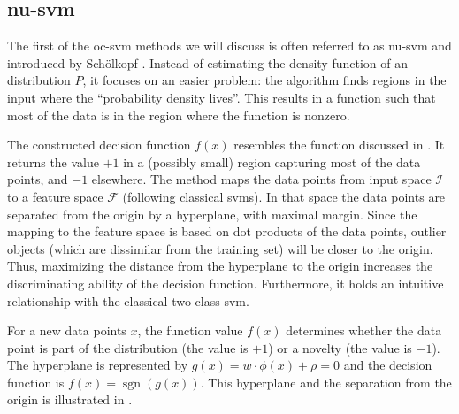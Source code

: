 



\subsection{\acrlong{nu-svm}}\label{subsec:nu-svm}
The first of the \gls{oc-svm} methods we will discuss is often referred to as \gls{nu-svm} and introduced by Sch\"olkopf \etal \cite{scholkopf1999support}.
Instead of estimating the density function of an distribution $P$, it focuses on an easier problem: the algorithm finds regions in the input where the ``probability density lives''.
This results in a function such that most of the data is in the region where the function is nonzero.

The constructed decision function $f(x)$ resembles the function discussed in .
It returns the value $+1$ in a (possibly small) region capturing most of the data points, and $-1$ elsewhere.
The method maps the data points from input space $\mathcal{I}$ to a feature space $\mathcal{F}$ (following classical \glspl{svm}).
In that space the data points are separated from the origin by a hyperplane, with maximal margin.
Since the mapping to the feature space is based on dot products of the data points, outlier objects (which are dissimilar from the training set) will be closer to the origin.
Thus, maximizing the distance from the hyperplane to the origin increases the discriminating ability of the decision function.
Furthermore, it holds an intuitive relationship with the classical two-class \gls{svm}.

For a new data points $x$, the function value $f(x)$ determines whether the data point is part of the distribution (\ie the value is $+1$) or a novelty (\ie the value is $-1$).
The hyperplane is represented by $g(x) = w \cdot \phi(x) + \rho = 0$ and the decision function is $f(x) = \operatorname{sgn}(g(x))$.
This hyperplane and the separation from the origin is illustrated in .

